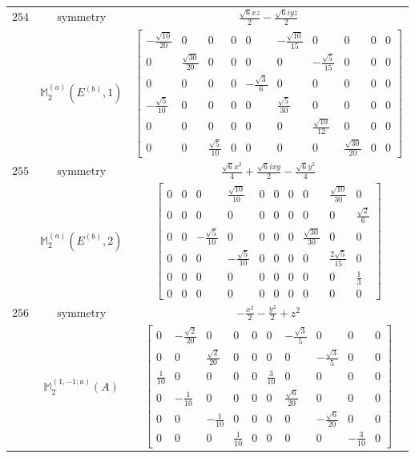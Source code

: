 \documentclass[fleqn,8pt,landscape]{jsarticle}
\begin{document}
\begin{longtable}{ccc}
$ 254 $ & $ \text{symmetry} $ & $ \frac{\sqrt{6} x z}{2} - \frac{\sqrt{6} i y z}{2} $ \\
$  $ & $ \mathbb{M}_{2}^{(a)}(E^{(b)},1) $ & $ \begin{bmatrix} - \frac{\sqrt{10}}{20} & 0 & 0 & 0 & 0 & - \frac{\sqrt{10}}{15} & 0 & 0 & 0 & 0 \\ 0 & \frac{\sqrt{30}}{20} & 0 & 0 & 0 & 0 & - \frac{\sqrt{5}}{15} & 0 & 0 & 0 \\ 0 & 0 & 0 & 0 & - \frac{\sqrt{3}}{6} & 0 & 0 & 0 & 0 & 0 \\ - \frac{\sqrt{5}}{10} & 0 & 0 & 0 & 0 & \frac{\sqrt{5}}{30} & 0 & 0 & 0 & 0 \\ 0 & 0 & 0 & 0 & 0 & 0 & \frac{\sqrt{10}}{12} & 0 & 0 & 0 \\ 0 & 0 & \frac{\sqrt{5}}{10} & 0 & 0 & 0 & 0 & \frac{\sqrt{30}}{20} & 0 & 0 \end{bmatrix} $ \\ \hline
$ 255 $ & $ \text{symmetry} $ & $ \frac{\sqrt{6} x^{2}}{4} + \frac{\sqrt{6} i x y}{2} - \frac{\sqrt{6} y^{2}}{4} $ \\
$  $ & $ \mathbb{M}_{2}^{(a)}(E^{(b)},2) $ & $ \begin{bmatrix} 0 & 0 & 0 & \frac{\sqrt{10}}{10} & 0 & 0 & 0 & 0 & \frac{\sqrt{10}}{30} & 0 \\ 0 & 0 & 0 & 0 & 0 & 0 & 0 & 0 & 0 & \frac{\sqrt{2}}{6} \\ 0 & 0 & - \frac{\sqrt{5}}{10} & 0 & 0 & 0 & 0 & \frac{\sqrt{30}}{30} & 0 & 0 \\ 0 & 0 & 0 & - \frac{\sqrt{5}}{10} & 0 & 0 & 0 & 0 & \frac{2 \sqrt{5}}{15} & 0 \\ 0 & 0 & 0 & 0 & 0 & 0 & 0 & 0 & 0 & \frac{1}{3} \\ 0 & 0 & 0 & 0 & 0 & 0 & 0 & 0 & 0 & 0 \end{bmatrix} $ \\ \hline
$ 256 $ & $ \text{symmetry} $ & $ - \frac{x^{2}}{2} - \frac{y^{2}}{2} + z^{2} $ \\
$  $ & $ \mathbb{M}_{2}^{(1,-1;a)}(A) $ & $ \begin{bmatrix} 0 & - \frac{\sqrt{2}}{20} & 0 & 0 & 0 & 0 & - \frac{\sqrt{3}}{5} & 0 & 0 & 0 \\ 0 & 0 & \frac{\sqrt{2}}{20} & 0 & 0 & 0 & 0 & - \frac{\sqrt{3}}{5} & 0 & 0 \\ \frac{1}{10} & 0 & 0 & 0 & 0 & \frac{3}{10} & 0 & 0 & 0 & 0 \\ 0 & - \frac{1}{10} & 0 & 0 & 0 & 0 & \frac{\sqrt{6}}{20} & 0 & 0 & 0 \\ 0 & 0 & - \frac{1}{10} & 0 & 0 & 0 & 0 & - \frac{\sqrt{6}}{20} & 0 & 0 \\ 0 & 0 & 0 & \frac{1}{10} & 0 & 0 & 0 & 0 & - \frac{3}{10} & 0 \end{bmatrix} $ \\ \hline

\end{longtable}
\end{document}
